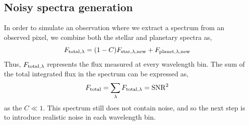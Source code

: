 \subsection{Noisy spectra generation}
In order to simulate an observation where we extract a spectrum from an observed pixel, we combine both the stellar and planetary spectra as,
 \begin{equation}
     F_{\rm{total},\lambda}=(1-C)F_{\rm{star},\lambda,new} + F_{\rm{planet},\lambda,new}
     \label{eq:insertion}
 \end{equation}
Thus, $F_{\rm{total,\lambda}}$ represents the flux measured at every wavelength bin.
The sum of the total integrated flux in the spectrum can be expressed as,
\begin{equation}
F_{\rm{total}}=\sum\limits_{\lambda}F_{\rm{total,\lambda}}=\rm{SNR}^2 
\label{eq: true signal}
\end{equation}
as the $C\ll1$.
This spectrum still does not contain noise, and so the next step is to introduce realistic noise in each wavelength bin. 
 
